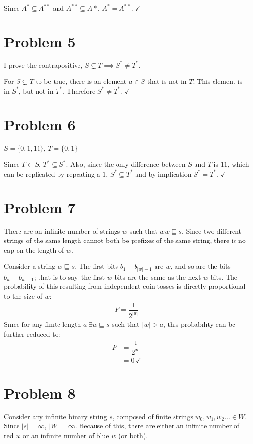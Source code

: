 \documentclass[11pt]{article}
\begin{document}
Since $A^* \subseteq A^{**}$ and $A^{**} \subseteq A*$, $A^* = A^{**}$. $\checkmark$

\section*{Problem 5}

I prove the contrapositive, $ S \subsetneq T \implies S^* \neq T^*$.


For $S \subsetneq T$ to be true, there is an element $a \in S$ that is not in $T$. This element is in $S^*$, but not in $T^*$. Therefore $S^* \neq T^*$. $\checkmark$

\section*{Problem 6}
$ S = \{0, 1, 11\}$, $T = \{0, 1\}$

Since $T \subset S$, $T^* \subseteq S^*$. Also, since the only difference between $S$ and $T$ is $11$, which can be replicated by repeating a $1$, $S^* \subseteq T^*$ and by implication $S^* = T^*$. $\checkmark$

\section*{Problem 7}
There are an infinite number of strings $w$ such that $ww \sqsubseteq s$. Since two different strings of the same length cannot both be prefixes of the same string, there is no cap on the length of $w$.

Consider a string $w \sqsubseteq s$.  The first bits $b_1 - b_{|w| -1}$ are $w$, and so are the bits $b_{w} - b_{w-1}$; that is to say, the first $w$ bits are the same as the next $w$ bits. The probability of this resulting from independent coin tosses is directly proportional to the size of $w$:
	\begin{align*}
	P = \dfrac{1}{2^{|w|}}
	\end{align*}
Since for any finite length $a\ \exists w \sqsubseteq s$ such that $|w| > a$, this probability can be further reduced to:
	\begin{align*}
	P &= \dfrac{1}{2^{\infty}} \\
	&=0\ \checkmark
	\end{align*}
	

\section*{Problem 8}
Consider any infinite binary string $s$, composed of finite strings $w_0, w_1, w_2  \dots \in W$. Since $|s| = \infty$, $|W| = \infty$. Because of this, there are either an infinite number of red $w$ or an infinite number of blue $w$ (or both).
\end{document}
